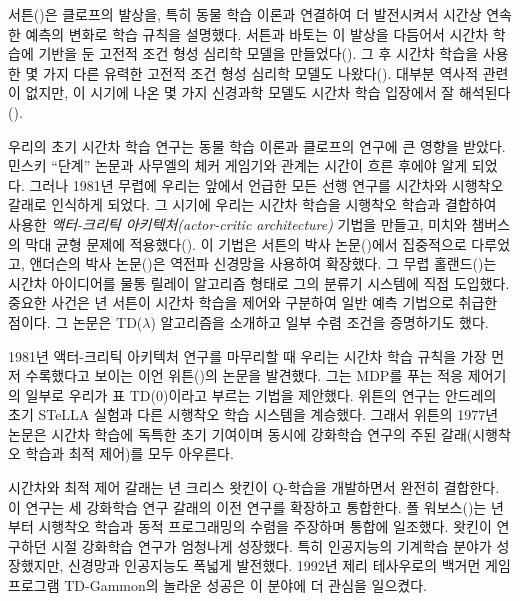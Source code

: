 서튼(\cite*{Sutton1978a, Sutton1978b, Sutton1978c})은 클로프의 발상을, 특히 동물
학습 이론과 연결하여 더 발전시켜서 시간상 연속한 예측의 변화로 학습 규칙을
설명했다. 서튼과 바토는 이 발상을 다듬어서 시간차 학습에 기반을 둔 고전적 조건
형성 심리학 모델을 만들었다(\cite{SuttonBarto1981a, BartoSutton1982}). 그 후
시간차 학습을 사용한 몇 가지 다른 유력한 고전적 조건 형성 심리학 모델도
나왔다(\cite{Klopf1988, MooreEt1986, SuttonBarto1987, SuttonBarto1990}). 대부분
역사적 관련이 없지만, 이 시기에 나온 몇 가지 신경과학 모델도 시간차 학습
입장에서 잘 해석된다(\cite{HawkinsKandel1984, ByrneGingrichBaxter1990,
GelperinHopfieldTank1985, Tesauro1986, FristonEt1994}).

우리의 초기 시간차 학습 연구는 동물 학습 이론과 클로프의 연구에 큰 영향을
받았다. 민스키 ``단계'' 논문과 사무엘의 체커 게임기와 관계는 시간이 흐른 후에야
알게 되었다. 그러나 1981년 무렵에 우리는 앞에서 언급한 모든 선행 연구를 시간차와
시행착오 갈래로 인식하게 되었다. 그 시기에 우리는 시간차 학습을 시행착오 학습과
결합하여
사용한 \emph{액터-크리틱 아키텍처(actor-critic architecture)} 기법을 만들고,
미치와 챔버스의 막대 균형 문제에 적용했다(\cite{BartoSuttonAnderson1983}). 이
기법은 서튼의 박사 논문(\cite*{Sutton1984})에서 집중적으로 다루었고, 앤더슨의
박사 논문(\cite*{Anderson1986})은 역전파 신경망을 사용하여 확장했다. 그 무렵
홀랜드(\cite*{Holland1986})는 시간차 아이디어를 물통 릴레이 알고리즘 형태로 그의
분류기 시스템에 직접
도입했다. 중요한 사건은 \cite*{Sutton1988}년 서튼이 시간차 학습을 제어와
구분하여 일반 예측 기법으로 취급한 점이다. 그 논문은 TD($\lambda$) 알고리즘을
소개하고 일부 수렴 조건을 증명하기도 했다.


1981년 액터-크리틱 아키텍처 연구를 마무리할 때 우리는 시간차 학습 규칙을 가장
먼저 수록했다고 보이는 이언 위튼(\cite{Witten1977})의 논문을 발견했다. 그는
MDP를 푸는 적응 제어기의 일부로 우리가 표 TD(0)이라고 부르는 기법을 제안했다.
위튼의 연구는 안드레의 초기 STeLLA 실험과 다른 시행착오 학습 시스템을 계승했다.
그래서 위튼의 1977년 논문은 시간차 학습에 독특한 초기 기여이며 동시에 강화학습
연구의 주된 갈래(시행착오 학습과 최적 제어)를 모두 아우른다.

시간차와 최적 제어 갈래는 \cite*{Watkins1989}년 크리스 왓킨이 Q-학습을
개발하면서 완전히 결합한다. 이 연구는 세 강화학습 연구 갈래의 이전 연구를
확장하고 통합한다. 폴 워보스(\cite{Werbos1987})는 \cite*{Werbos1977}년부터
시행착오 학습과 동적 프로그래밍의 수렴을 주장하며 통합에 일조했다. 왓킨이
연구하던 시절 강화학습 연구가 엄청나게 성장했다. 특히 인공지능의 기계학습 분야가
성장했지만, 신경망과 인공지능도 폭넓게 발전했다. 1992년 제리 테사우로의 백거먼
게임 프로그램 TD-Gammon의 놀라운 성공은 이 분야에 더 관심을 일으켰다.

